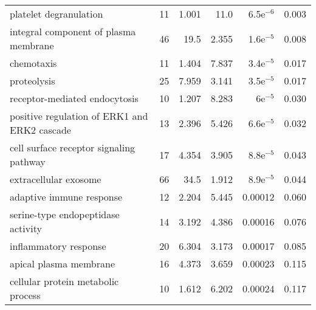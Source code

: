 \begin{longtable}{lrrrrr}
                       platelet degranulation &                      11 &                   1.001 &       11.0 &          6.5e$^{-6}$ &                0.003 \\
        integral component of plasma membrane &                      46 &                    19.5 &      2.355 &          1.6e$^{-5}$ &                0.008 \\
                                   chemotaxis &                      11 &                   1.404 &      7.837 &          3.4e$^{-5}$ &                0.017 \\
                                  proteolysis &                      25 &                   7.959 &      3.141 &          3.5e$^{-5}$ &                0.017 \\
                receptor-mediated endocytosis &                      10 &                   1.207 &      8.283 &            6e$^{-5}$ &                0.030 \\
 positive regulation of ERK1 and ERK2 cascade &                      13 &                   2.396 &      5.426 &          6.6e$^{-5}$ &                0.032 \\
      cell surface receptor signaling pathway &                      17 &                   4.354 &      3.905 &          8.8e$^{-5}$ &                0.043 \\
                        extracellular exosome &                      66 &                    34.5 &      1.912 &          8.9e$^{-5}$ &                0.044 \\
                     adaptive immune response &                      12 &                   2.204 &      5.445 &              0.00012 &                0.060 \\
           serine-type endopeptidase activity &                      14 &                   3.192 &      4.386 &              0.00016 &                0.076 \\
                        inflammatory response &                      20 &                   6.304 &      3.173 &              0.00017 &                0.085 \\
                       apical plasma membrane &                      16 &                   4.373 &      3.659 &              0.00023 &                0.115 \\
           cellular protein metabolic process &                      10 &                   1.612 &      6.202 &              0.00024 &                0.117 \\

\end{longtable}
